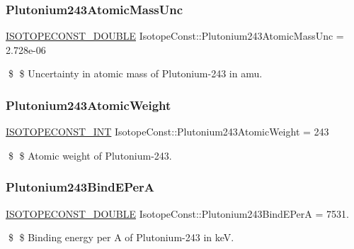 \subsubsection{\texorpdfstring{Plutonium243\+Atomic\+Mass\+Unc}{Plutonium243AtomicMassUnc}}
{\footnotesize\ttfamily \mbox{\hyperlink{group___isotope_const-_macros_ga8f45a7272ce02c0b4c65c44636ed719a}{I\+S\+O\+T\+O\+P\+E\+C\+O\+N\+S\+T\+\_\+\+D\+O\+U\+B\+LE}} Isotope\+Const\+::\+Plutonium243\+Atomic\+Mass\+Unc = 2.\+728e-\/06}

\$ \$ Uncertainty in atomic mass of Plutonium-\/243 in amu. \mbox{\label{group___isotope_const-_plutonium-_pu243_gaa9cd521aaee7d07f8cba063a0d2d5406}} 
\subsubsection{\texorpdfstring{Plutonium243\+Atomic\+Weight}{Plutonium243AtomicWeight}}
{\footnotesize\ttfamily \mbox{\hyperlink{group___isotope_const-_macros_ga5f18360b3e99483a35c32d789e62621c}{I\+S\+O\+T\+O\+P\+E\+C\+O\+N\+S\+T\+\_\+\+I\+NT}} Isotope\+Const\+::\+Plutonium243\+Atomic\+Weight = 243}

\$ \$ Atomic weight of Plutonium-\/243. \mbox{\label{group___isotope_const-_plutonium-_pu243_ga392855be7cf6af2db4aae2f590877846}} 
\subsubsection{\texorpdfstring{Plutonium243\+Bind\+E\+PerA}{Plutonium243BindEPerA}}
{\footnotesize\ttfamily \mbox{\hyperlink{group___isotope_const-_macros_ga8f45a7272ce02c0b4c65c44636ed719a}{I\+S\+O\+T\+O\+P\+E\+C\+O\+N\+S\+T\+\_\+\+D\+O\+U\+B\+LE}} Isotope\+Const\+::\+Plutonium243\+Bind\+E\+PerA = 7531.}

\$ \$ Binding energy per A of Plutonium-\/243 in keV. \mbox{\label{group___isotope_const-_plutonium-_pu243_ga7efef0db55abb927f914cc2e7ddf88af}} 
